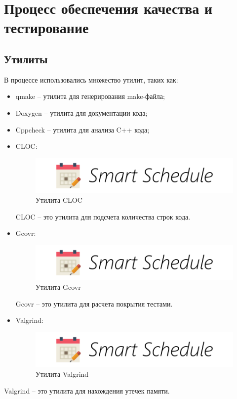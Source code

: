 \section{Процесс обеспечения качества и тестирование}

\subsection{Утилиты}
В процессе использовались множество утилит, таких как:
\begin{itemize}
\item qmake -- утилита для генерирования make-файла;
\item Doxygen -- утилита для документации кода;
\item Cppcheck -- утилита для анализа C++ кода;
\item CLOC:
\begin{figure}[H]
	\begin{center}
		\includegraphics[scale=0.7]{pics/logo}
		\caption{Утилита CLOC} 
		\label{pic:cloc} %
	\end{center}
\end{figure}
CLOC -- это утилита для подсчета количества строк кода.

\item Gcovr:
\begin{figure}[H]
	\begin{center}
		\includegraphics[scale=0.7]{pics/logo}
		\caption{Утилита Gcovr} 
		\label{pic:gcovr} %
	\end{center}
\end{figure}
Gcovr -- это утилита для расчета покрытия тестами.

\item Valgrind:
\begin{figure}[H]
	\begin{center}
		\includegraphics[scale=0.7]{pics/logo}
		\caption{Утилита Valgrind} 
		\label{pic:valgrind} %
	\end{center}
\end{figure}
\end{itemize}
Valgrind -- это утилита для нахождения утечек памяти.



